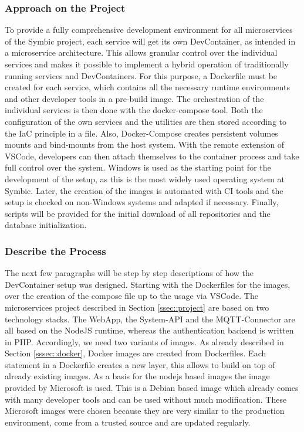 \documentclass[12pt, a4paper]{article}
\begin{document}
        \subsubsection{Approach on the Project}\label{ssec::imp_approach}
        To provide a fully comprehensive development environment for all microservices of the Symbic project, each service will get its own DevContainer, as intended in a microservice architecture. This allows granular control over the individual services and makes it possible to implement a hybrid operation of traditionally running services and DevContainers. For this purpose, a Dockerfile must be created for each service, which contains all the necessary runtime environments and other developer tools in a pre-build image. The orchestration of the individual services is then done with the docker-compose tool. Both the configuration of the own services and the utilities are then stored according to the \ac{IaC} principle in a  file. Also, Docker-Compose creates persistent volumes mounts and bind-mounts from the host system. With the remote extension of \ac{VSCode}, developers can then attach themselves to the container process and take full control over the system.\newline
        Windows is used as the starting point for the development of the setup, as this is the most widely used operating system at Symbic. Later, the creation of the images is automated with CI tools and the setup is checked on non-Windows systems and adapted if necessary. Finally, scripts will be provided for the initial download of all repositories and the database initialization.

        \subsubsection{Describe the Process}\label{ssec::imp_process}
        The next few paragraphs will be step by step descriptions of how the DevContainer setup was designed. Starting with the Dockerfiles for the images, over the creation of the compose file up to the usage via \ac{VSCode}.
        The microservices project described in Section \ref{ssec::project} are based on two technology stacks. The WebApp, the System-API and the MQTT-Connector are all based on the NodeJS runtime, whereas the authentication backend is written in PHP. Accordingly, we need two variants of images. As already described in Section \ref{sssec::docker}, Docker images are created from Dockerfiles. Each statement in a Dockerfile creates a new layer, this allows to build on top of already existing images.\newline
        As a basis for the nodejs based images the  image provided by Microsoft is used. This is a Debian based image which already comes with many developer tools and can be used without much modification. These Microsoft images were chosen because they are very similar to the production environment, come from a trusted source and are updated regularly.
\end{document}
